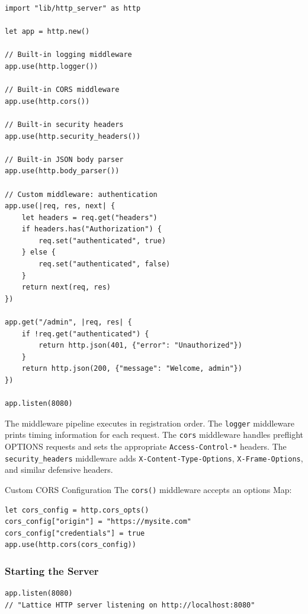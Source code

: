\begin{lstlisting}[language=Lattice, caption={Adding middleware to a server}]
import "lib/http_server" as http

let app = http.new()

// Built-in logging middleware
app.use(http.logger())

// Built-in CORS middleware
app.use(http.cors())

// Built-in security headers
app.use(http.security_headers())

// Built-in JSON body parser
app.use(http.body_parser())

// Custom middleware: authentication
app.use(|req, res, next| {
    let headers = req.get("headers")
    if headers.has("Authorization") {
        req.set("authenticated", true)
    } else {
        req.set("authenticated", false)
    }
    return next(req, res)
})

app.get("/admin", |req, res| {
    if !req.get("authenticated") {
        return http.json(401, {"error": "Unauthorized"})
    }
    return http.json(200, {"message": "Welcome, admin"})
})

app.listen(8080)
\end{lstlisting}

The middleware pipeline executes in registration order. The \lstinline|logger|
middleware prints timing information for each request. The \lstinline|cors|
middleware handles preflight OPTIONS requests and sets the appropriate
\texttt{Access-Control-*} headers. The \lstinline|security_headers| middleware
adds \texttt{X-Content-Type-Options}, \texttt{X-Frame-Options}, and similar
defensive headers.

\begin{tipbox}{Custom CORS Configuration}
The \lstinline|cors()| middleware accepts an options Map:
\begin{lstlisting}[language=Lattice]
let cors_config = http.cors_opts()
cors_config["origin"] = "https://mysite.com"
cors_config["credentials"] = true
app.use(http.cors(cors_config))
\end{lstlisting}
\end{tipbox}

\subsubsection{Starting the Server}

\begin{lstlisting}[language=Lattice, caption={Starting the server}]
app.listen(8080)
// "Lattice HTTP server listening on http://localhost:8080"
\end{lstlisting}

